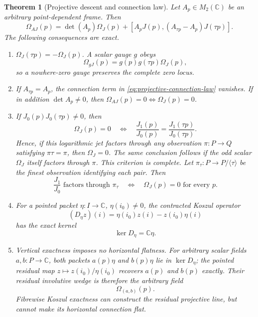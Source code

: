 \documentclass[11pt]{article}
\newtheorem{theorem}{Theorem}[section]
\theoremstyle{definition}
\theoremstyle{remark}
\newcommand{\C}{\mathbb C}
\begin{document}
\begin{theorem}[Projective descent and connection law]
\label{thm:projective-descent}
Let \(A_p\in M_2(\C)\) be an arbitrary point-dependent frame.  Then
\[
 \boxed{\quad
 \Omega_{AJ}(p)=\det(A_p)\Omega_J(p)
   +[A_pJ(p),(A_{\tau p}-A_p)J(\tau p)].
 \quad}
\tag{4.17Q}\label{eq:projective-connection-law}
\]
The following consequences are exact.

\begin{enumerate}[label=(\roman*)]
\item \(\Omega_J(\tau p)=-\Omega_J(p)\).  A scalar gauge \(g\) obeys
      \[
         \Omega_{gJ}(p)=g(p)g(\tau p)\Omega_J(p),
      \tag{4.17R}\label{eq:wedge-gauge-covariance}
      \]
      so a nowhere-zero gauge preserves the complete zero locus.
\item If \(A_{\tau p}=A_p\), the connection term in
      \eqref{eq:projective-connection-law} vanishes.  If in addition
      \(\det A_p\ne0\), then
      \(\Omega_{AJ}(p)=0\Longleftrightarrow\Omega_J(p)=0\).
\item If \(J_0(p)J_0(\tau p)\ne0\), then
      \[
       \Omega_J(p)=0
       \quad\Longleftrightarrow\quad
       \frac{J_1(p)}{J_0(p)}=
       \frac{J_1(\tau p)}{J_0(\tau p)}.
      \tag{4.17S}\label{eq:log-jet-descent}
      \]
      Hence, if this logarithmic jet factors through any observation
      \(\pi:P\to Q\) satisfying \(\pi\tau=\pi\), then \(\Omega_J=0\).
      The same conclusion follows if the odd scalar \(\Omega_J\) itself
      factors through \(\pi\).  This criterion is complete.  Let
      \(\pi_\tau:P\to P/\langle\tau\rangle\) be the finest observation
      identifying each pair.  Then
      \[
       \frac{J_1}{J_0}\text{ factors through }\pi_\tau
       \quad\Longleftrightarrow\quad
       \Omega_J(p)=0\text{ for every }p.
      \tag{4.17S1}\label{eq:orbit-quotient-complete-descent}
      \]
\item For a pointed packet \(\eta:I\to\C\), \(\eta(i_0)\ne0\), the
      contracted Koszul operator
      \[
                    (D_\eta z)(i)=\eta(i_0)z(i)-z(i_0)\eta(i)
      \tag{4.17T}\label{eq:contracted-projective-koszul}
      \]
      has the exact kernel
      \[
                         \ker D_\eta=\C\eta.
      \tag{4.17U}\label{eq:koszul-ray-kernel}
      \]
\item Vertical exactness imposes no horizontal flatness.  For arbitrary
      scalar fields \(a,b:P\to\C\), both packets \(a(p)\eta\) and
      \(b(p)\eta\) lie in \(\ker D_\eta\); the pointed residual map
      \(z\mapsto z(i_0)/\eta(i_0)\) recovers \(a(p)\) and \(b(p)\)
      exactly.  Their residual involutive wedge is therefore the arbitrary
      field
      \[
                         \Omega_{(a,b)}(p).
      \tag{4.17V}\label{eq:vertical-horizontal-separation}
      \]
      Fibrewise Koszul exactness can construct the residual projective line,
      but cannot make its horizontal connection flat.
\end{enumerate}
\end{theorem}
\end{document}
